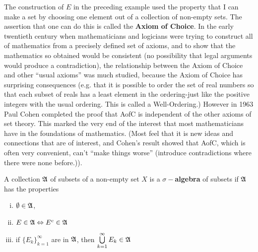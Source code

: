 \begin{rmk}%
	The construction of $E$ in the preceding example used the property 
	that I can make a set by choosing one element out of a collection of 
	non-empty sets. The assertion that one can do this is called the 
	\textbf{Axiom of Choice}. In the early twentieth century when 
	mathematicians and logicians were trying to construct all of 
	mathematics from a precisely defined set of axioms, and to show that 
	the mathematics so obtained would be consistent (no possibility that 
	legal arguments would produce a contradiction), the relationship 
	between the Axiom of Choice and other ``usual axioms'' was much studied, 
	because the Axiom of Choice has surprising consequences (e.g. that it 
	is possible to order the set of real numbers so that each subset of 
	reals has a least element in the ordering-just like the positive integers 
	with the usual ordering. This is called a Well-Ordering.) However in 
	1963 Paul Cohen completed the proof that AofC is independent of the other 
	axioms of set theory. This marked the very end of the interest that most 
	mathematicians have in the foundations of mathematics. (Most feel that it 
	is new ideas and connections that are of interest, and Cohen's result 
	showed that AofC, which is often very convenient, can't ``make things 
	worse'' (introduce contradictions where there were none before.)).
\end{rmk}

\begin{defn}\label{d:sigmaalgebra}%
	A collection $\mathfrak{A}$ of subsets of a non-empty set $X$ is a 
	$\sigma-$\textbf{algebra} of subsets if $\mathfrak{A}$ has the properties 
	\begin{enumerate}[(i)]
		\item $\emptyset \in \mathfrak{A}$, 
		\item $E \in \mathfrak{A} \Leftrightarrow E^c \in \mathfrak{A}$
		\item if $\{E_k\}_{k=1}^\infty$ are in $\mathfrak{A}$, then 
			$\bigcup\limits_{k=1}^\infty E_k \in \mathfrak{A}$
	\end{enumerate}
\end{defn}

